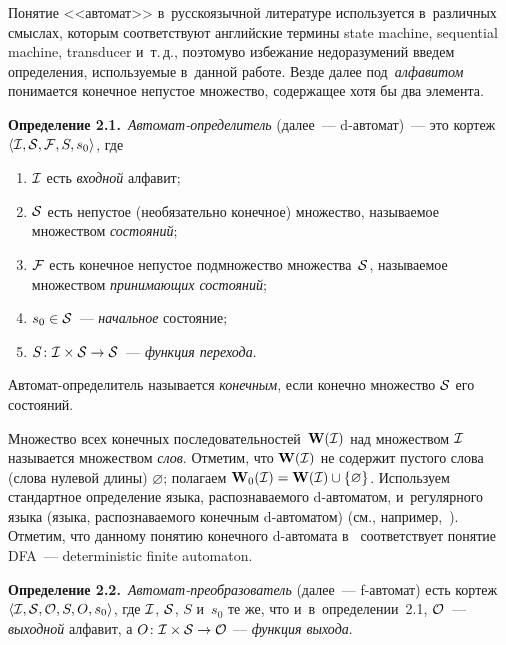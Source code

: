 \begin{multicols}{2}
Понятие <<автомат>> в~русскоязычной литературе  используется в~различных
смыслах, которым со\-ответствуют  английские термины state machine, sequential
machine, transducer и~т.\,д., поэтому\linebreak во избежание недоразумений введем определения,
используемые  в~данной работе. Везде далее под~\textit{алфавитом} понимается
конечное непустое множество, содержащее хотя бы два элемента.

\smallskip

\noindent
\textbf{Определение 2.1.}\
\textit{Автомат-определитель} (далее~--- d-ав\-то\-мат)~--- 
это кортеж $\langle\mathcal I,\mathcal S,\mathcal F,S,s_0\rangle$,
где
\begin{enumerate}[(1)]
\item $\mathcal I$  есть  \textit{входной} алфавит;
\item $\mathcal S$ есть непустое (необязательно конечное) множество, называемое
множеством \textit{со\-сто\-яний};
\item $\mathcal F$ есть конечное непустое подмножество множества~$\mathcal S$, называемое
множеством \textit{при\-ни\-ма\-ющих со\-сто\-яний};
\item $s_0\in\mathcal S$~--- \textit{начальное} со\-сто\-яние;
\item $S\colon \mathcal I\times\mathcal S\to \mathcal S$~--- \textit{функция перехода}.
\end{enumerate}
Автомат-определитель называется \textit{конечным}, если конечно множество $\mathcal S$ его
состояний.

\smallskip

Множество  всех конечных последовательностей~$\mathbf W(\mathcal I)$ над множеством
$\mathcal I$ называется множеством \textit{слов}. Отметим, что $\mathbf W(\mathcal I)$ не содержит пустого слова (слова нулевой длины)
$\varnothing$; полагаем $\mathbf W_0(\Cal I)\hm=\mathbf W(\Cal I)\cup \{\varnothing\}$.
Используем стандартное определение языка, распознаваемого d-ав\-то\-ма\-том, и~регулярного
языка (языка, распознаваемого конечным d-ав\-то\-ма\-том) (см., 
например,~\cite{Allouche-Shall}).
Отметим, что данному понятию конечного d-ав\-то\-ма\-та в~\cite{Allouche-Shall} соответствует
понятие DFA~--- deterministic finite automaton.


\smallskip

\noindent
\textbf{Определение 2.2.}\
\textit{Автомат-преобразователь} (далее~--- f-ав\-то\-мат)  
есть кортеж $\langle\mathcal I,\mathcal S,\mathcal O,S,O,s_0\rangle$,
где $\mathcal I$, $\mathcal S$, $S$ и~$s_0$  те же, что и~в~определении~2.1,
$\mathcal O$~---   \textit{выходной} алфавит, а $O\colon \mathcal I\times\mathcal S\to\mathcal O$ ---
\textit{функция выхода}.



\end{multicols}
